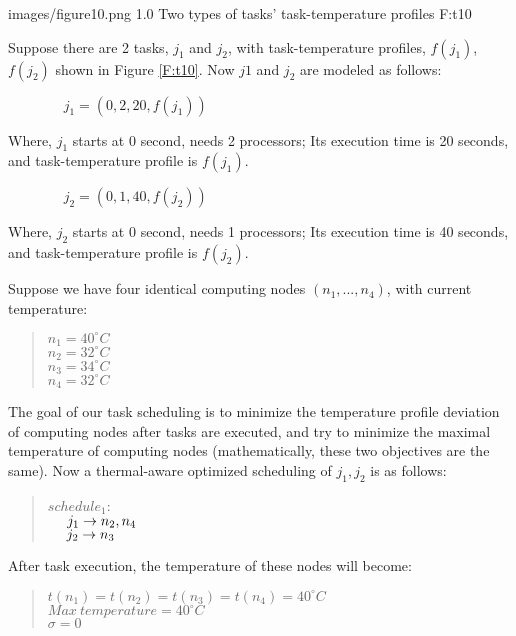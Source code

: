  {images/figure10.png}
  {1.0}
 {Two types of tasks' task-temperature profiles}
 {F:t10}

Suppose there are 2 tasks, $j_1$ and $j_2$, with task-temperature profiles, $f(j_1)$, $f(j_2)$ shown in Figure \ref{F:t10}.
Now $j1$ and $j_2$ are modeled as follows:

$~~~~~~~~~~~~~~~~~~j_1=(0, 2, 20, f(j_1))$

Where, $j_1$ starts at 0 second, needs 2 processors; Its execution time is 20 seconds, and task-temperature profile is $f(j_1)$.

$~~~~~~~~~~~~~~~~~~j_2=(0, 1, 40, f(j_2))$

Where, $j_2$ starts at 0 second, needs 1 processors; Its execution time is 40 seconds, and task-temperature profile is $f(j_2)$.

Suppose we have four identical computing nodes $(n_1,..., n_4)$, with current temperature: 

\begin{quote}
$n_1=40^\circ C$ \\
$n_2=32^\circ C$ \\
$n_3=34^\circ C$ \\
$n_4=32^\circ C$ \\
\end{quote}

The goal of our task scheduling is to minimize the temperature profile deviation of computing nodes after tasks are  executed, and try to minimize the maximal temperature of computing nodes (mathematically, these two objectives are the same). Now a thermal-aware optimized scheduling of $j_1, j_2$ is as follows:

\begin{quote}
$schedule_1$:\\
$\mbox{~~~~} j_1\to n_2, n_4$\\
$\mbox{~~~~} j_2 \to n_3$\\
\end{quote}

After task execution, the temperature of these nodes will become:

\begin{quote}
$t(n_1)=
t(n_2)=
t(n_3)=
t(n_4)=
40^\circ C$ \\
$Max~temperature=40^\circ C$ \\
$\sigma=0$ \\
\end{quote}

